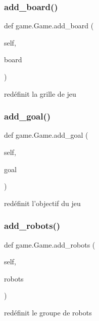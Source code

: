 \subsubsection{\texorpdfstring{add\+\_\+board()}{add\_board()}}
{\footnotesize\ttfamily def game.\+Game.\+add\+\_\+board (\begin{DoxyParamCaption}\item[{}]{self,  }\item[{}]{board }\end{DoxyParamCaption})}

\begin{DoxyVerb}redéfinit la grille de jeu \end{DoxyVerb}
 \mbox{\label{classgame_1_1Game_a7465d51560b2d485db6ed53907cf1397}} 
\subsubsection{\texorpdfstring{add\+\_\+goal()}{add\_goal()}}
{\footnotesize\ttfamily def game.\+Game.\+add\+\_\+goal (\begin{DoxyParamCaption}\item[{}]{self,  }\item[{}]{goal }\end{DoxyParamCaption})}

\begin{DoxyVerb}redéfinit l'objectif du jeu \end{DoxyVerb}
 \mbox{\label{classgame_1_1Game_a7e642c0246cea6fa82e92247fa4c3b93}} 
\subsubsection{\texorpdfstring{add\+\_\+robots()}{add\_robots()}}
{\footnotesize\ttfamily def game.\+Game.\+add\+\_\+robots (\begin{DoxyParamCaption}\item[{}]{self,  }\item[{}]{robots }\end{DoxyParamCaption})}

\begin{DoxyVerb}redéfinit le groupe de robots \end{DoxyVerb}
 \mbox{\label{classgame_1_1Game_a2c3428bb9f61284ee0febe00d7850dfa}} 
